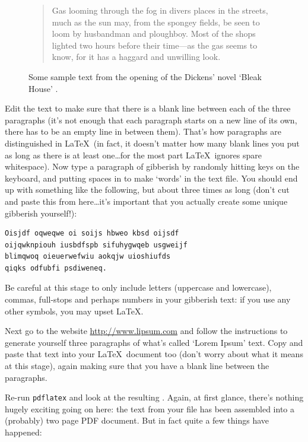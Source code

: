 \begin{refsection}
\begin{figure}[tbp]
\begin{quote}
Gas looming through the fog in divers places in the streets, much as
the sun may, from the spongey fields, be seen to loom by husbandman
and ploughboy. Most of the shops lighted two hours before their
time---as the gas seems to know, for it has a haggard and unwilling
look.

\end{quote}

\caption{Some sample text from the opening of the Dickens' novel `Bleak House' \citep{dickens1852}.}\label{figure:bleakhouse}
\end{figure}

Edit the text to make sure that there is a blank line between each of the three paragraphs (it's not enough that each paragraph starts on a new line of its own, there has to be an empty line in between them). That's how paragraphs are distinguished in \LaTeX\ (in fact, it doesn't matter how many blank lines you put as long as there is at least one\ldots for the most part \LaTeX\ ignores spare whitespace). Now type a paragraph of gibberish by randomly hitting keys on the keyboard, and putting spaces in to make `words' in the text file. You should end up with something like the following, but about three times as long (don't cut and paste this from here\ldots it's important that you actually create some unique gibberish yourself!):

\begin{verbatim}
Oisjdf oqweqwe oi soijs hbweo kbsd oijsdf 
oijqwknpiouh iusbdfspb sifuhygwqeb usgweijf 
blimqwoq oieuerwefwiu aokqjw uioshiufds 
qiqks odfubfi psdiweneq.
\end{verbatim}

Be careful at this stage to only include letters (uppercase and lowercase), commas, full-stops and perhaps numbers in your gibberish text: if you use any other symbols, you may upset \LaTeX. 

Next go to the website \href{http://www.lipsum.com/}{http://www.lipsum.com} and follow the instructions to generate yourself three paragraphs of what's called `Lorem Ipsum' text. Copy and paste that text into your \LaTeX\ document too (don't worry about what it means at this stage), again making sure that you have a blank line between the paragraphs.

Re-run \texttt{pdflatex} and look at the resulting . Again, at first glance, there's nothing hugely exciting going on here: the text from your  file has been assembled into a (probably) two page PDF document. But in fact quite a few things have happened: 


\end{refsection}
